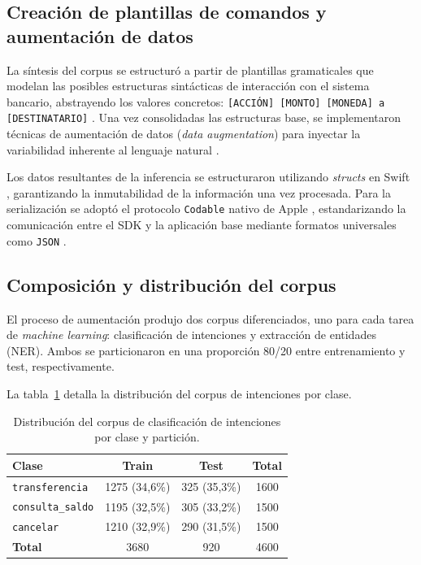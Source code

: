 \subsection{Creación de plantillas de comandos y aumentación de datos}

La síntesis del corpus se estructuró a partir de plantillas gramaticales que modelan las posibles estructuras sintácticas de interacción con el sistema bancario, abstrayendo los valores concretos: \texttt{[ACCIÓN] [MONTO] [MONEDA] a [DESTINATARIO]} . Una vez consolidadas las estructuras base, se implementaron técnicas de aumentación de datos (\textit{data augmentation}) para inyectar la variabilidad inherente al lenguaje natural \citep{feng2021survey}.

Los datos resultantes de la inferencia se estructuraron utilizando \textit{structs} en Swift \citep{apple2026swiftlanguage}, garantizando la inmutabilidad de la información una vez procesada. Para la serialización se adoptó el protocolo \texttt{Codable} nativo de Apple \citep{apple2026codable}, estandarizando la comunicación entre el SDK y la aplicación base mediante formatos universales como \texttt{JSON} \citep{rfc8259json}.

\subsection{Composición y distribución del corpus}

El proceso de aumentación produjo dos corpus diferenciados, uno para cada tarea de \textit{machine learning}: clasificación de intenciones y extracción de entidades (NER). Ambos se particionaron en una proporción 80/20 entre entrenamiento y test, respectivamente.

La tabla~\ref{tab:corpus-intenciones} detalla la distribución del corpus de intenciones por clase.

\begin{table}[H]
\caption{Distribución del corpus de clasificación de intenciones por clase y partición.}
\centering
\begin{tabular}{@{}lccc@{}}
\toprule
\textbf{Clase} & \textbf{Train} & \textbf{Test} & \textbf{Total} \\
\midrule
\texttt{transferencia}   & 1275 (34,6\%) & 325 (35,3\%) & 1600 \\
\texttt{consulta\_saldo} & 1195 (32,5\%) & 305 (33,2\%) & 1500 \\
\texttt{cancelar}        & 1210 (32,9\%) & 290 (31,5\%) & 1500 \\
\midrule
\textbf{Total}           & 3680          & 920          & 4600 \\
\bottomrule
\end{tabular}

\label{tab:corpus-intenciones}
\end{table}

